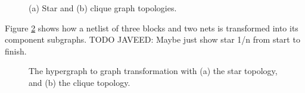 \begin{figure}[!htbp]
\centering
{}
\caption{(a) Star and (b) clique graph topologies.}
\label{fig:star_clique}
\end{figure}



Figure \ref{fig:hyperedge_to_graph} shows how a netlist of three blocks and two nets is transformed into its component subgraphs. TODO JAVEED: Maybe just show star 1/n from start to finish.

\begin{figure}[!htbp]
\centering
{}
\caption{The hypergraph to graph transformation with (a) the star topology, and (b) the clique topology.}
\label{fig:hyperedge_to_graph}
\end{figure}

